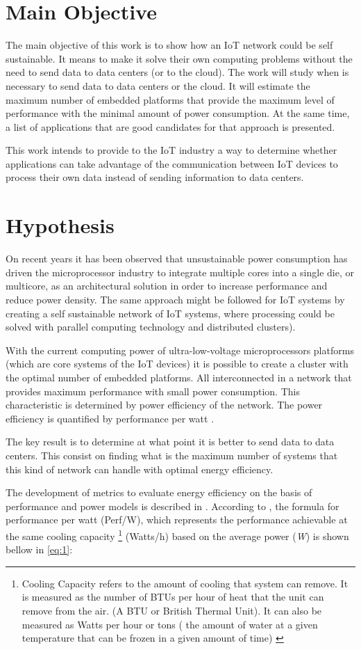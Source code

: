 \section{Main Objective} \noindent

The main objective of this work is to show how an IoT network could be self
sustainable. It means to make it solve their own computing problems without the
need to send data to data centers (or to the cloud). The work will study when
is necessary to send data to data centers or the cloud.
It will estimate the maximum number of embedded platforms that provide the
maximum level of performance with the minimal amount of power consumption. At the
same time, a list of applications that are good candidates for that approach is
presented. 

This work intends to provide to the IoT industry a way  to determine whether
applications can take advantage of the communication between  IoT devices
to process their own data instead of sending information to data centers.

\section{Hypothesis} \noindent

On recent years it has been observed that unsustainable power consumption has
driven the microprocessor industry to integrate multiple cores into a single
die, or multicore, as an architectural solution in order to increase
performance and reduce power density. The same approach might be followed for
IoT systems by creating a self sustainable network of IoT systems, where
processing could be solved with parallel computing technology and distributed
clusters).

With the current computing power of ultra-low-voltage microprocessors
platforms (which are core systems of the IoT devices) it is possible to create a cluster
with the optimal number of embedded platforms. All interconnected in a
network that provides maximum performance with small
power consumption. This characteristic is determined by power efficiency of
the network. The power efficiency is quantified by performance per watt
\cite{Jun}.

The key result is to determine at what point it is better to send data to data
centers. This consist on finding what is the maximum number of systems that
this kind of network can handle with optimal energy efficiency.

The development of metrics to evaluate energy efficiency on the basis of
performance and power models is described in \cite{Dong}. According to
\cite{Dong}, the formula for performance per watt (Perf/W), which represents the
performance achievable at the same cooling capacity \footnote{Cooling
Capacity refers to the amount of cooling that system can remove. It is measured as the
number of BTUs per hour of heat that the unit can remove from the air. (A BTU
or British Thermal Unit). It can also be measured as Watts per hour or tons (
the amount of water at a given temperature that can be frozen in a given amount
of time) \cite{Siegenthaler} } (Watts/h) based on the average power
(\textit{W}) is shown bellow in \ref{eq:1}:

